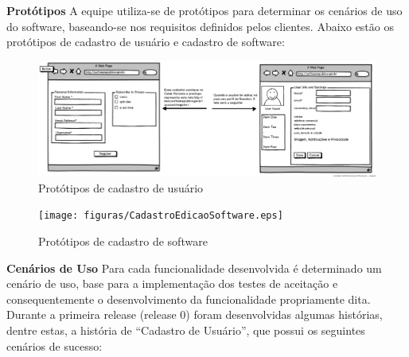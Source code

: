	

\textbf{Protótipos}
	A equipe utiliza-se de protótipos para determinar os cenários de uso do software, baseando-se nos requisitos definidos pelos clientes. Abaixo estão os protótipos de cadastro de usuário e cadastro de software:

	\begin{figure}[h!]
    	\centering
    	\includegraphics[keepaspectratio=true,scale=0.32]
      		{figuras/CadastroEdicaoUser.eps}
    	\caption{Protótipos de cadastro de usuário}
    	\label{cadastro user}
	\end{figure}

	\begin{figure}[h!]
    	\centering
    	\texttt{[image: figuras/CadastroEdicaoSoftware.eps]}
    	\caption{Protótipos de cadastro de software}
    	\label{cadastro software}
	\end{figure}

\newpage

\textbf{Cenários de Uso}
	Para cada funcionalidade desenvolvida é determinado um cenário de uso, base para a implementação dos testes de aceitação e consequentemente o desenvolvimento da funcionalidade propriamente dita.
	Durante a primeira release (release 0) foram desenvolvidas algumas histórias, dentre estas, a história de ``Cadastro de Usuário'', que possui os seguintes cenários de sucesso:

